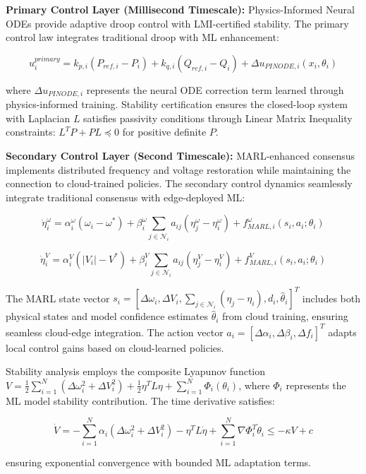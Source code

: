 \documentclass[12pt]{article}
\begin{document}
\textbf{Primary Control Layer (Millisecond Timescale):} Physics-Informed Neural ODEs provide adaptive droop control with LMI-certified stability. The primary control law integrates traditional droop with ML enhancement:

$$u_i^{primary} = k_{p,i}(P_{ref,i} - P_i) + k_{q,i}(Q_{ref,i} - Q_i) + \Delta u_{PINODE,i}(x_i, \theta_i)$$

where $\Delta u_{PINODE,i}$ represents the neural ODE correction term learned through physics-informed training. Stability certification ensures the closed-loop system with Laplacian $L$ satisfies passivity conditions through Linear Matrix Inequality constraints: $L^T P + PL \preceq 0$ for positive definite $P$.

\textbf{Secondary Control Layer (Second Timescale):} MARL-enhanced consensus implements distributed frequency and voltage restoration while maintaining the connection to cloud-trained policies. The secondary control dynamics seamlessly integrate traditional consensus with edge-deployed ML:

$$\dot{\eta}_i^{\omega} = \alpha_i^{\omega}(\omega_i - \omega^*) + \beta_i^{\omega} \sum_{j \in \mathcal{N}_i} a_{ij}(\eta_j^{\omega} - \eta_i^{\omega}) + f_{MARL,i}^{\omega}(s_i, a_i; \theta_i)$$

$$\dot{\eta}_i^{V} = \alpha_i^{V}(|V_i| - V^*) + \beta_i^{V} \sum_{j \in \mathcal{N}_i} a_{ij}(\eta_j^{V} - \eta_i^{V}) + f_{MARL,i}^{V}(s_i, a_i; \theta_i)$$

The MARL state vector $s_i = [\Delta\omega_i, \Delta V_i, \sum_{j \in \mathcal{N}_i}(\eta_j - \eta_i), d_i, \hat{\theta}_i]^T$ includes both physical states and model confidence estimates $\hat{\theta}_i$ from cloud training, ensuring seamless cloud-edge integration. The action vector $a_i = [\Delta\alpha_i, \Delta\beta_i, \Delta f_i]^T$ adapts local control gains based on cloud-learned policies.

Stability analysis employs the composite Lyapunov function $V = \frac{1}{2}\sum_{i=1}^N (\Delta\omega_i^2 + \Delta V_i^2) + \frac{1}{2}\eta^T L \eta + \sum_{i=1}^N \Phi_i(\theta_i)$, where $\Phi_i$ represents the ML model stability contribution. The time derivative satisfies:

$$\dot{V} = -\sum_{i=1}^N \alpha_i(\Delta\omega_i^2 + \Delta V_i^2) - \eta^T L \dot{\eta} + \sum_{i=1}^N \nabla\Phi_i^T \dot{\theta}_i \leq -\kappa V + c$$

ensuring exponential convergence with bounded ML adaptation terms.
\end{document}
